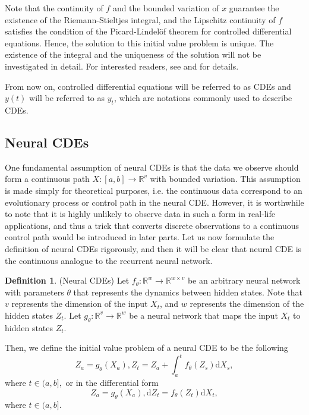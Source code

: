 \documentclass[a4paper,11pt,titlepage]{article}
\theoremstyle{definition}
\newtheorem{definition}{Definition}[section]
\theoremstyle{plain}
\theoremstyle{remark}
\begin{document}
Note that the continuity of $f$ and the bounded variation of $x$ guarantee the existence of the Riemann-Stieltjes integral, and the Lipschitz continuity of $f$ satisfies the condition of the Picard-Lindelöf theorem for controlled differential equations. Hence, the solution to this initial value problem is unique. The existence of the integral and the uniqueness of the solution will not be investigated in detail. For interested readers, see \cite{kidger2022neural} and \cite{rudin1953} for details.

From now on, controlled differential equations will be referred to as CDEs and $y(t)$ will be referred to as $y_t$, which are notations commonly used to describe CDEs.

\subsection{Neural CDEs}

One fundamental assumption of neural CDEs is that the data we observe should form a continuous path $X:[a,b]\rightarrow\mathbb{R}^v$ with bounded variation. This assumption is made simply for theoretical purposes, i.e. the continuous data correspond to an evolutionary process or control path in the neural CDE. However, it is worthwhile to note that it is highly unlikely to observe data in such a form in real-life applications, and thus a trick that converts discrete observations to a continuous control path would be introduced in later parts. Let us now formulate the definition of neural CDEs rigorously, and then it will be clear that neural CDE is the continuous analogue to the recurrent neural network.

\begin{definition}
    (Neural CDEs) Let $f_\theta:\mathbb{R}^w\rightarrow\mathbb{R}^{w\times v}$ be an arbitrary neural network with parameters $\theta$ that represents the dynamics between hidden states. Note that $v$ represents the dimension of the input $X_t$, and $w$ represents the dimension of the hidden states $Z_t$. Let $g_\theta:\mathbb{R}^v\rightarrow\mathbb{R}^w$ be a neural network that maps the input $X_t$ to hidden states $Z_t$.

Then, we define the initial value problem of a neural CDE to be the following
$$Z_a=g_\theta(X_a), Z_t=Z_a+\int_a^tf_\theta(Z_s)\mathrm{d}X_s,$$ where $t\in(a,b],$
or in the differential form
$$Z_a=g_\theta(X_a), \mathrm{d}Z_t=f_\theta(Z_t)\mathrm{d}X_t,$$ where $t\in(a,b].$ \cite{kidger2022neural}
\end{definition}
\end{document}
